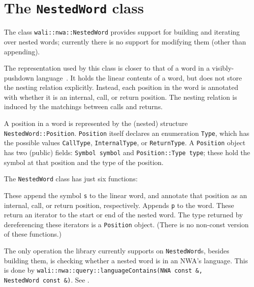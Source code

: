 \section{The \texttt{NestedWord} class}
\label{Se:class-nested-word}

The class \texttt{wali::nwa::NestedWord} provides support for
building and iterating over nested words; currently there
is no support for modifying them (other than appending).

The representation used by this class is closer to that of a word in a
visibly-pushdown language~\cite{JACM:AM2009}. It holds the linear contents of
a word, but does not store the nesting relation explicitly. Instead, each
position in the word is annotated with whether it is an internal, call, or
return position. The nesting relation is induced by the matchings between
calls and returns.

A position in a word is represented by the (nested) structure
\texttt{NestedWord::Position}. \texttt{Position} itself declares an
enumeration \texttt{Type}, which has the possible values \texttt{CallType},
\texttt{InternalType}, or \texttt{ReturnType}.
A \texttt{Position} object has two (public) fields: \texttt{Symbol symbol}
and \texttt{Position::Type type}; these hold the symbol at that position and
the type of the position.


The \texttt{NestedWord} class has just six functions:
\begin{functionlist}
    These append the symbol \texttt{s} to the linear word, and annotate that
    position as an internal, call, or return position, respectively.
    Appends \texttt{p} to the word.
    These return an iterator to the start or end
    of the nested word. The type returned by dereferencing these iterators is
    a \texttt{Position} object. (There is no non-const version of these
    functions.)
\end{functionlist}

The only operation the library currently supports on
\texttt{NestedWord}s, besides building them, is checking whether a
nested word is in an NWA's language. This is done by
\texttt{wali::nwa::query::languageContains(\mbox{NWA const \&}, \mbox{NestedWord const \&})}. See
.

